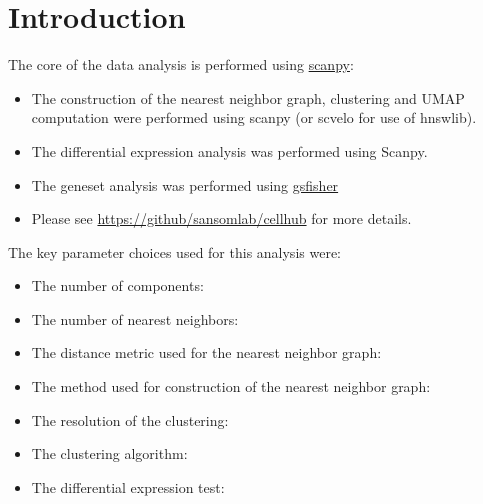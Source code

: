 \section{Introduction}

The core of the data analysis is performed using \href{https://scanpy.readthedocs.io/}{scanpy}:

\begin{itemize}
\item The construction of the nearest neighbor graph, clustering and UMAP computation were performed using scanpy (or scvelo for use of hnswlib).
\item The differential expression analysis was performed using Scanpy.
\item The geneset analysis was performed using \href{https://github.com/sansomlab/gsfisher}{gsfisher}
\item Please see \href{https://github.com/sansomlab/cellhub}{https://github/sansomlab/cellhub} for more details.
\end{itemize}

The key parameter choices used for this analysis were:

\begin{itemize}
\item The number of \reductionType{} components: \nComponents
\item The number of nearest neighbors: \nnK
\item The distance metric used for the nearest neighbor graph: \nnMetric
\item The method used for construction of the nearest neighbor graph: \nnMethod
\item The resolution of the clustering: \resolution
\item The clustering algorithm: \clusteringAlgorithm
\item The differential expression test: \deTest
\end{itemize}

\clearpage
